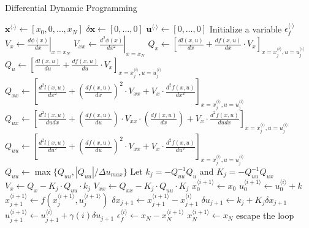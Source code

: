 \documentclass{article}
\begin{document}
\begin{algorithm}[t]
\caption{Differential Dynamic Programming}\label{DDP}
\renewcommand{\algorithmicrequire}{\textbf{Input:}}
\begin{algorithmic}[1]
\State $\mathbf{x}^{\langle \cdot \rangle}\leftarrow [x_0,0,\ldots,x_N]$
\State $\delta\mathbf{x}\leftarrow [0,\ldots,0]$
\State $\mathbf{u}^{\langle \cdot \rangle}\leftarrow [0,\ldots,0]$
\State Initialize a variable $\epsilon_f^{\langle \cdot \rangle}$
\textcolor{gray}{}
\State $V_x \leftarrow \left.\frac{d\phi(x)}{dx}\right|_{x=x_N}$
\State $V_{xx} \leftarrow \left.\frac{d^2\phi(x)}{dx^2}\right|_{x=x_N}$
 \textcolor{gray}{}
\State $Q_x \leftarrow \left[\frac{dl(x,u)}{dx}+\frac{df(x,u)}{dx}\cdot V_x\right]_{x=x_j^{\langle i \rangle},u=u_j^{\langle i \rangle}}$
\State $Q_u \leftarrow \left[\frac{dl(x,u)}{du}+\frac{df(x,u)}{du}\cdot V_x\right]_{x=x_j^{\langle i \rangle},u=u_j^{\langle i \rangle}}$
\State $Q_{xx} \leftarrow \left[\frac{d^2l(x,u)}{dx^2}+\left(\frac{df(x,u)}{dx}\right)^2\cdot V_{xx} + V_x \cdot \frac{d^2f(x,u)}{dx^2}\right]_{x=x_j^{\langle i \rangle},u=u_j^{\langle i \rangle}}$
\State $Q_{ux} \leftarrow \left[\frac{d^2l(x,u)}{dudx}+\left(\frac{df(x,u)}{du}\right)\cdot V_{xx} \cdot \left(\frac{df(x,u)}{dx}\right) + V_x \cdot \frac{d^2f(x,u)}{dudx}\right]_{x=x_j^{\langle i \rangle},u=u_j^{\langle i \rangle}}$
\State $Q_{uu} \leftarrow \left[\frac{d^2l(x,u)}{du^2}+\left(\frac{df(x,u)}{du}\right)^2\cdot V_{xx} + V_x \cdot \frac{d^2f(x,u)}{du^2}\right]_{x=x_j^{\langle i \rangle},u=u_j^{\langle i \rangle}}$
\State $Q_{uu} \leftarrow \max\{Q_{uu},|Q_{uu}|/\Delta u_{max}\}$
\EndIf
\State Let $k_j=-Q_{uu}^{-1}Q_{u}$ and $K_j=-Q_{uu}^{-1}Q_{ux}$
\State $V_x \leftarrow Q_x-K_j\cdot Q_{uu}\cdot k_j$\textcolor{gray}{}
\State $V_{xx} \leftarrow Q_{xx}-K_j\cdot Q_{uu}\cdot K_j$
\EndFor
\State $x_0^{\langle i+1 \rangle} \leftarrow x_0$
\State $u_0^{\langle i+1 \rangle} \leftarrow u_0^{\langle i \rangle} + k$ 
\textcolor{gray}{}
\State $x_{j+1}^{\langle i+1 \rangle} \leftarrow f(x_j^{\langle i+1 \rangle},u_j^{\langle i+1 \rangle})$
\State $\delta x_{j+1} \leftarrow x_{j+1}^{\langle i+1 \rangle} - x_{j+1}^{\langle i \rangle}$
\State $\delta u_{j+1} \leftarrow k_j+K_j\delta x_{j+1}$\textcolor{gray}{}
\State $ u_{j+1}^{\langle i+1\rangle} \leftarrow u_{j+1}^{\langle i\rangle} + \gamma(i)\delta u_{j+1}$
\EndFor
\State $\epsilon_f^{\langle i \rangle} \leftarrow x_N - x_N^{\langle i+1 \rangle}$
\State $x_N^{\langle i+1 \rangle} \leftarrow x_N$
escape the loop
\EndIf
\EndFor
\end{algorithmic}
\end{algorithm}
\end{document}
